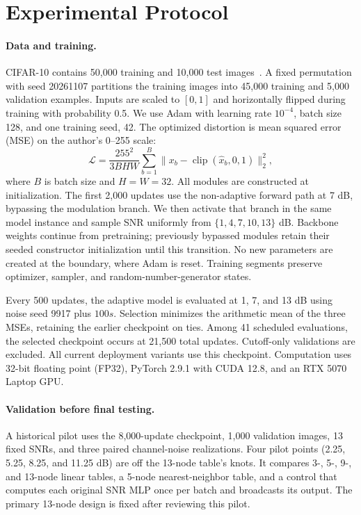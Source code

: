 \section{Experimental Protocol}
\paragraph{Data and training.}
CIFAR-10 contains 50,000 training and 10,000 test images~\cite{krizhevsky2009learning}. A fixed permutation with seed 20261107 partitions the training images into 45,000 training and 5,000 validation examples. Inputs are scaled to $[0,1]$ and horizontally flipped during training with probability 0.5. We use Adam with learning rate $10^{-4}$, batch size 128, and one training seed, 42. The optimized distortion is mean squared error (MSE) on the author's 0--255 scale:
\begin{equation}
 \mathcal L=\frac{255^2}{3BHW}\sum_{b=1}^{B}
 \|x_b-\operatorname{clip}(\hat x_b,0,1)\|_2^2,
\end{equation}
where $B$ is batch size and $H=W=32$. All modules are constructed at initialization. The first 2,000 updates use the non-adaptive forward path at 7 dB, bypassing the modulation branch. We then activate that branch in the same model instance and sample SNR uniformly from $\{1,4,7,10,13\}$ dB. Backbone weights continue from pretraining; previously bypassed modules retain their seeded constructor initialization until this transition. No new parameters are created at the boundary, where Adam is reset. Training segments preserve optimizer, sampler, and random-number-generator states.

Every 500 updates, the adaptive model is evaluated at 1, 7, and 13 dB using noise seed 9917 plus $100s$. Selection minimizes the arithmetic mean of the three MSEs, retaining the earlier checkpoint on ties. Among 41 scheduled evaluations, the selected checkpoint occurs at 21,500 total updates. Cutoff-only validations are excluded. All current deployment variants use this checkpoint. Computation uses 32-bit floating point (FP32), PyTorch 2.9.1 with CUDA 12.8, and an RTX 5070 Laptop GPU.

\paragraph{Validation before final testing.}
A historical pilot uses the 8,000-update checkpoint, 1,000 validation images, 13 fixed SNRs, and three paired channel-noise realizations. Four pilot points (2.25, 5.25, 8.25, and 11.25 dB) are off the 13-node table's knots. It compares 3-, 5-, 9-, and 13-node linear tables, a 5-node nearest-neighbor table, and a control that computes each original SNR MLP once per batch and broadcasts its output. The primary 13-node design is fixed after reviewing this pilot.

